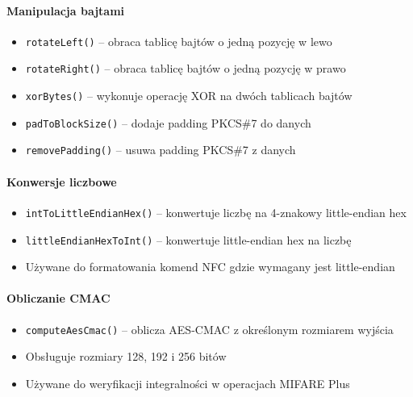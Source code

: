 \documentclass[a4paper,12pt]{article}
\begin{document}
\paragraph{Manipulacja bajtami}
\begin{itemize}
    \item \texttt{rotateLeft()} -- obraca tablicę bajtów o jedną pozycję w lewo
    \item \texttt{rotateRight()} -- obraca tablicę bajtów o jedną pozycję w prawo
    \item \texttt{xorBytes()} -- wykonuje operację XOR na dwóch tablicach bajtów
    \item \texttt{padToBlockSize()} -- dodaje padding PKCS\#7 do danych
    \item \texttt{removePadding()} -- usuwa padding PKCS\#7 z danych
\end{itemize}

\paragraph{Konwersje liczbowe}
\begin{itemize}
    \item \texttt{intToLittleEndianHex()} -- konwertuje liczbę na 4-znakowy little-endian hex
    \item \texttt{littleEndianHexToInt()} -- konwertuje little-endian hex na liczbę
    \item Używane do formatowania komend NFC gdzie wymagany jest little-endian
\end{itemize}

\paragraph{Obliczanie CMAC}
\begin{itemize}
    \item \texttt{computeAesCmac()} -- oblicza AES-CMAC z określonym rozmiarem wyjścia
    \item Obsługuje rozmiary 128, 192 i 256 bitów
    \item Używane do weryfikacji integralności w operacjach MIFARE Plus
\end{itemize}
\end{document}

